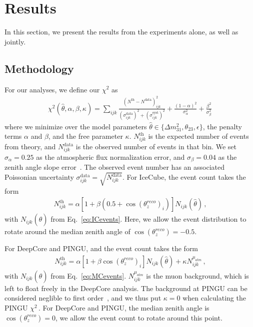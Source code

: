 \documentclass[draft=True]{revtex4-2}
\newcommand{\zreco}{\ensuremath{\cos{(\theta_z^{reco})}}}
\newcommand{\dm}{\Delta m^2_{31}}
\begin{document}
\section{Results}
In this section, we present the results from the experiments alone, as well as jointly. 
\subsection{Methodology}\label{sec:method}
For our analyses, we define our $\chi^2$ as
\begin{align} \label{eq:chisq}
    \chi^{2}(\hat{\theta},\alpha,\beta, \kappa)=\sum_{ijk} \frac{\left(N^\text{th}-N^\text{data}\right)_{ijk}^{2}}
    {\left(\sigma^\text{data}_{ijk}\right)^{2} + \left(\sigma^\text{syst}_{ijk}\right)^{2}}+ 
    \frac{(1-\alpha)^2}{\sigma_\alpha^2} + \frac{\beta^2}{\sigma_\beta^2}\,
\end{align}
where we minimize over the model parameters $\hat{\theta} \in \{\dm, \theta_{23}, \epsilon\}$, the penalty terms $\alpha$ and $\beta$, and the free parameter $\kappa$.
$N_{ijk}^\text{th}$ is the expected number of events from theory, and $N_{ijk}^\text{data}$ is the observed number of events in that bin. We set $\sigma_\alpha = 0.25$ as the atmospheric flux normalization error, and $\sigma_\beta = 0.04$ as the zenith angle slope error~\cite{hondapaper}. 
The observed event number has an associated Poissonian uncertainty $\sigma_{ijk}^\text{data} = \sqrt{N_{ijk}^\text{data}}$.
For IceCube, the event count takes the form
\begin{align}
    N^\text{th}_{ijk} = \alpha\left[1+\beta (0.5 + \zreco_i )\right] N_{ijk}(\hat{\theta})\,,
\end{align}
with $N_{ijk}(\hat{\theta})$ from Eq.~\ref{eq:ICevents}. Here, we allow the event distribution to rotate around the median zenith angle of $\zreco = -0.5$.

For DeepCore and PINGU, and the event count takes the form
\begin{align}
    N^\text{th}_{ijk} = \alpha\left[1+\beta \zreco_i \right] N_{ijk}(\hat{\theta}) + \kappa N_{ijk}^{\mu_{atm}}\,,
\end{align}
with $N_{ijk}(\hat{\theta})$ from Eq.~\ref{eq:MCevents}. $N_{ijk}^{\mu_{atm}}$ is the muon background, which is left to float freely in the DeepCore analysis.
The background at PINGU can be considered neglible to first order~\cite{PINGUdata}, and we thus put $\kappa=0$ when calculating the PINGU $\chi^2$\,. 
For DeepCore and PINGU, the median zenith angle is $\zreco = 0$, we allow the event count to rotate around this point.
\end{document}
